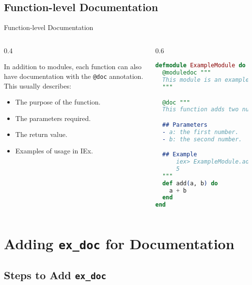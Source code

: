 \documentclass[aspectratio=169, table]{beamer}
\begin{document}
\subsection{Function-level Documentation}

\begin{frame}[fragile]{Function-level Documentation}
\vspace{15pt}

\begin{columns}

\begin{column}[t]{0.4\textwidth}

In addition to modules, each function can also have documentation  
with the \texttt{@doc} annotation. This usually describes:  
\begin{itemize}
  \item The purpose of the function.  
  \item The parameters required.  
  \item The return value.  
  \item Examples of usage in IEx.  
\end{itemize}
\end{column}

\begin{column}[t]{0.6\textwidth}

\begin{lstlisting}[language=Elixir, basicstyle=\ttfamily\scriptsize]
defmodule ExampleModule do
  @moduledoc """
  This module is an example of how to document a module in Elixir.
  """

  @doc """
  This function adds two numbers.

  ## Parameters
  - a: the first number.
  - b: the second number.

  ## Example
      iex> ExampleModule.add(2, 3)
      5
  """
  def add(a, b) do
    a + b
  end
end
\end{lstlisting}
\end{column}

\end{columns}
\end{frame}


\section{Adding \texttt{ex\_doc} for Documentation}

\subsection{Steps to Add \texttt{ex\_doc}}
\end{document}
